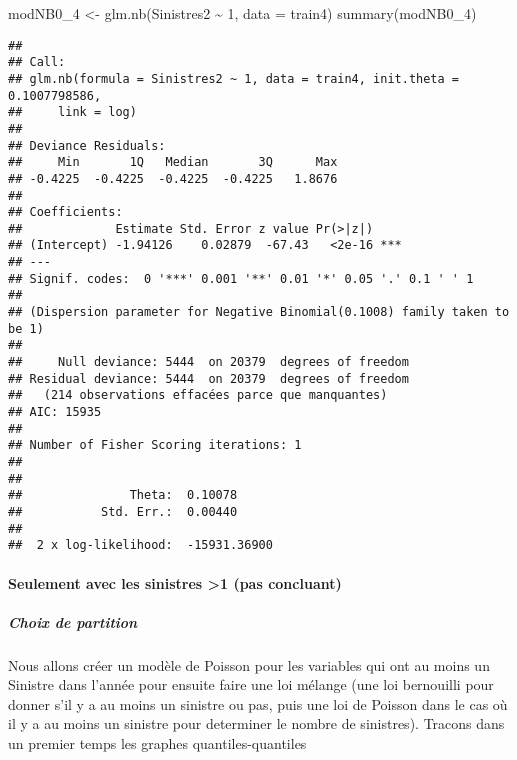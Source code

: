 \documentclass[
]{article}
\newenvironment{Shaded}{\begin{snugshade}}{\end{snugshade}}
\newcommand{\AttributeTok}[1]{\textcolor[rgb]{0.77,0.63,0.00}{#1}}
\newcommand{\DecValTok}[1]{\textcolor[rgb]{0.00,0.00,0.81}{#1}}
\newcommand{\FunctionTok}[1]{\textcolor[rgb]{0.00,0.00,0.00}{#1}}
\newcommand{\NormalTok}[1]{#1}
\newcommand{\OtherTok}[1]{\textcolor[rgb]{0.56,0.35,0.01}{#1}}
\newcommand{\SpecialCharTok}[1]{\textcolor[rgb]{0.00,0.00,0.00}{#1}}
\begin{document}
\begin{Shaded}
\begin{Highlighting}[]
\NormalTok{modNB0\_4 }\OtherTok{\textless{}{-}} \FunctionTok{glm.nb}\NormalTok{(Sinistres2 }\SpecialCharTok{\textasciitilde{}} \DecValTok{1}\NormalTok{, }\AttributeTok{data =}\NormalTok{ train4)}
\FunctionTok{summary}\NormalTok{(modNB0\_4)}
\end{Highlighting}
\end{Shaded}

\begin{verbatim}
## 
## Call:
## glm.nb(formula = Sinistres2 ~ 1, data = train4, init.theta = 0.1007798586, 
##     link = log)
## 
## Deviance Residuals: 
##     Min       1Q   Median       3Q      Max  
## -0.4225  -0.4225  -0.4225  -0.4225   1.8676  
## 
## Coefficients:
##             Estimate Std. Error z value Pr(>|z|)    
## (Intercept) -1.94126    0.02879  -67.43   <2e-16 ***
## ---
## Signif. codes:  0 '***' 0.001 '**' 0.01 '*' 0.05 '.' 0.1 ' ' 1
## 
## (Dispersion parameter for Negative Binomial(0.1008) family taken to be 1)
## 
##     Null deviance: 5444  on 20379  degrees of freedom
## Residual deviance: 5444  on 20379  degrees of freedom
##   (214 observations effacées parce que manquantes)
## AIC: 15935
## 
## Number of Fisher Scoring iterations: 1
## 
## 
##               Theta:  0.10078 
##           Std. Err.:  0.00440 
## 
##  2 x log-likelihood:  -15931.36900
\end{verbatim}

\hypertarget{seulement-avec-les-sinistres-1-pas-concluant}{%
\paragraph{Seulement avec les sinistres \textgreater1 (pas
concluant)}\label{seulement-avec-les-sinistres-1-pas-concluant}}

\hypertarget{choix-de-partition}{%
\subparagraph{Choix de partition}\label{choix-de-partition}}

\begin{Shaded}
\end{Shaded}

Nous allons créer un modèle de Poisson pour les variables qui ont au
moins un Sinistre dans l'année pour ensuite faire une loi mélange (une
loi bernouilli pour donner s'il y a au moins un sinistre ou pas, puis
une loi de Poisson dans le cas où il y a au moins un sinistre pour
determiner le nombre de sinistres). Tracons dans un premier temps les
graphes quantiles-quantiles
\end{document}
